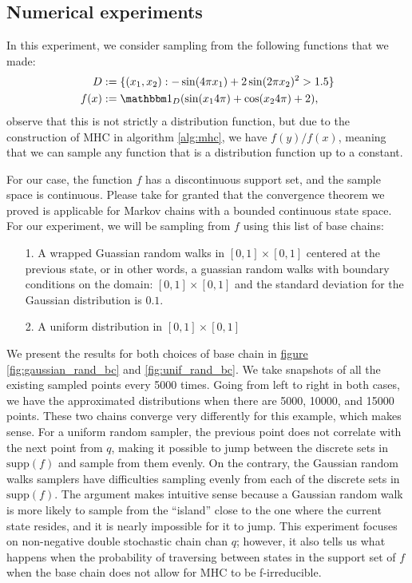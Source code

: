 \documentclass[]{article}
\theoremstyle{definition}
\begin{document}
    \subsection{Numerical experiments}
        In this experiment, we consider sampling from the following functions that we made: 
        \begin{align*}
            D &:= \{(x_1, x_2): -\sin(4\pi x_1) + 2\sin(2\pi x_2)^2 > 1.5\}
            \\
            f(x) &:= \mathbbm 1_D (\sin(x_14\pi) + \cos(x_24\pi) + 2), 
        \end{align*}
        observe that this is not strictly a distribution function, but due to the construction of MHC in algorithm \ref*{alg:mhc}, we have $f(y)/f(x)$, meaning that we can sample any function that is a distribution function up to a constant.
        \par
        For our case, the function $f$ has a discontinuous support set, and the sample space is continuous. Please take for granted that the convergence theorem we proved is applicable for Markov chains with a bounded continuous state space. For our experiment, we will be sampling from $f$ using this list of base chains: 
        \begin{itemize}
            \item [1.] A wrapped Guassian random walks in $[0, 1]\times [0, 1]$ centered at the previous state, or in other words, a guassian random walks with boundary conditions on the domain: $[0, 1]\times[0, 1]$ and the standard deviation for the Gaussian distribution is $0.1$. 
            \item [2.] A uniform distribution in $[0, 1]\times [0, 1]$
        \end{itemize}
        We present the results for both choices of base chain in \hyperref[fig:gaussian_rand_bc]{figure \ref*{fig:gaussian_rand_bc}} and \hyperref[fig:unif_rand_bc]{\ref*{fig:unif_rand_bc}}. We take snapshots of all the existing sampled points every 5000 times. Going from left to right in both cases, we have the approximated distributions when there are 5000, 10000, and 15000 points. These two chains converge very differently for this example, which makes sense. For a uniform random sampler, the previous point does not correlate with the next point from $q$, making it possible to jump between the discrete sets in $\text{supp}(f)$ and sample from them evenly. On the contrary, the Gaussian random walks samplers have difficulties sampling evenly from each of the discrete sets in $\text{supp}(f)$. The argument makes intuitive sense because a Gaussian random walk is more likely to sample from the ``island'' close to the one where the current state resides, and it is nearly impossible for it to jump. This experiment focuses on non-negative double stochastic chain chan $q$; however, it also tells us what happens when the probability of traversing between states in the support set of $f$ when the base chain does not allow for MHC to be f-irreducible. 
\end{document}
